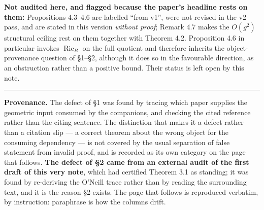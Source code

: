 \documentclass[11pt]{article}
\begin{document}
\textbf{Not audited here, and flagged because the paper's headline rests on them:}
Propositions 4.3--4.6 are labelled ``from v1'', were not revised in the v2 pass, and
are stated in this version \emph{without proof}; Remark 4.7 makes the $O(g^2)$
structural ceiling rest on them together with Theorem 4.2. Proposition 4.6 in
particular invokes $\operatorname{Ric}_B$ on the full quotient and therefore inherits
the object-provenance question of \S1--\S2, although it does so in the favourable
direction, as an obstruction rather than a positive bound. Their status is left open
by this note.

\vspace{4pt}
\noindent\rule{\textwidth}{0.8pt}

\noindent\footnotesize
\textbf{Provenance.} The defect of \S1 was found by tracing which paper supplies the
geometric input consumed by the companions, and checking the cited reference rather
than the citing sentence. The distinction that makes it a defect rather than a
citation slip --- a correct theorem about the wrong object for the consuming
dependency --- is not covered by the usual separation of false statement from invalid
proof, and is recorded as its own category on the page that follows. \textbf{The
defect of \S2 came from an external audit of the first draft of this very note}, which
had certified Theorem 3.1 as standing; it was found by re-deriving the O'Neill trace
rather than by reading the surrounding text, and it is the reason \S2 exists. The
page that follows is reproduced verbatim, by instruction: paraphrase is how the
columns drift.
\end{document}
